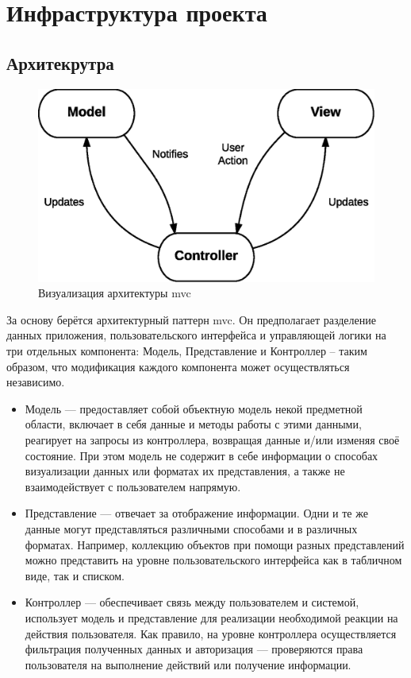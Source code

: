 \section{Инфраструктура проекта}

\subsection{Архитекрутра}
\begin{figure}[h]
    \begin{center}
        \includegraphics[scale=0.7]{images/MVC-basic.eps}
    \end{center}
    \caption{Визуализация архитектуры \acrshort{mvc}}
\end{figure}

За основу берётся архитектурный паттерн \acrshort{mvc}. Он предполагает разделение данных приложения, пользовательского интерфейса и управляющей логики на три отдельных компонента: Модель, Представление и Контроллер – таким образом, что модификация каждого компонента может осуществляться независимо.

\begin{itemize}
    \item Модель --- предоставляет собой объектную модель некой предметной области, включает в себя данные и методы работы с этими данными, реагирует на запросы из контроллера, возвращая данные и/или изменяя своё состояние. При этом модель не содержит в себе информации о способах визуализации данных или форматах их представления, а также не взаимодействует с пользователем напрямую.
    \item Представление --- отвечает за отображение информации. Одни и те же данные могут представляться различными способами и в различных форматах. Например, коллекцию объектов при помощи разных представлений можно представить на уровне пользовательского интерфейса как в табличном виде, так и списком.
    \item Контроллер --- обеспечивает связь между пользователем и системой, использует модель и представление для реализации необходимой реакции на действия пользователя. Как правило, на уровне контроллера осуществляется фильтрация полученных данных и авторизация — проверяются права пользователя на выполнение действий или получение информации.
\end{itemize}

